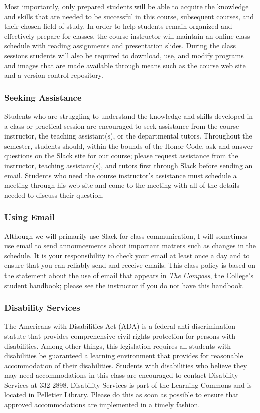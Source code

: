Most importantly, only prepared students will be able to acquire the knowledge and skills that are needed to be
successful in this course, subsequent courses, and their chosen field of study. In order to help students remain
organized and effectively prepare for classes, the course instructor will maintain an online class schedule with reading
assignments and presentation slides. During the class sessions students will also be required to download, use, and
modify programs and images that are made available through means such as the course web site and a version control
repository.

\subsubsection*{Seeking Assistance}

Students who are struggling to understand the knowledge and skills developed in a class or practical session are
encouraged to seek assistance from the course instructor, the teaching assistant(s), or the departmental tutors.
Throughout the semester, students should, within the bounds of the Honor Code, ask and answer questions on the Slack
site for our course; please request assistance from the instructor, teaching assistant(s), and tutors first through
Slack before sending an email. Students who need the course instructor's assistance must schedule a meeting through his
web site and come to the meeting with all of the details needed to discuss their question.

\subsubsection*{Using Email}

Although we will primarily use Slack for class communication, I will sometimes use email to send announcements about
important matters such as changes in the schedule. It is your responsibility to check your email at least once a day and
to ensure that you can reliably send and receive emails. This class policy is based on the statement about the use of
email that appears in {\em The Compass\/}, the College's student handbook; please see the instructor if you do not have
this handbook.

\subsubsection*{Disability Services}

The Americans with Disabilities Act (ADA) is a federal anti-discrimination statute that provides comprehensive civil
rights protection for persons with disabilities. Among other things, this legislation requires all students with
disabilities be guaranteed a learning environment that provides for reasonable accommodation of their disabilities.
Students with disabilities who believe they may need accommodations in this class are encouraged to contact Disability
Services at 332-2898. Disability Services is part of the Learning Commons and is located in Pelletier Library.
Please do this as soon as possible to ensure that approved accommodations are implemented in a timely fashion.

